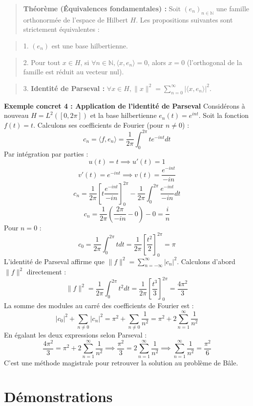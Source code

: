 \documentclass[11pt,a4paper]{article}
\begin{document}
\begin{quote}\textbf{Théorème (Équivalences fondamentales) :} Soit $(e_n)_{n \in \mathbb{N}}$ une famille orthonormée de l'espace de Hilbert $H$. Les propositions suivantes sont strictement équivalentes :\end{quote}
\begin{quote}1. $(e_n)$ est une base hilbertienne.\end{quote}
\begin{quote}2. Pour tout $x \in H$, si $\forall n \in \mathbb{N}, \langle x, e_n \rangle = 0$, alors $x=0$ (l'orthogonal de la famille est réduit au vecteur nul).\end{quote}
\begin{quote}3. \textbf{Identité de Parseval :} $\forall x \in H, \|x\|^2 = \sum_{n=0}^\infty |\langle x, e_n \rangle|^2$.\end{quote}

\textbf{Exemple concret 4 : Application de l'identité de Parseval}
Considérons à nouveau $H = L^2([0, 2\pi])$ et la base hilbertienne $e_n(t) = e^{int}$.
Soit la fonction $f(t) = t$. Calculons ses coefficients de Fourier (pour $n \neq 0$) :
$$ c_n = \langle f, e_n \rangle = \frac{1}{2\pi} \int_0^{2\pi} t e^{-int} dt $$
Par intégration par parties :
$$ u(t) = t \implies u'(t) = 1 $$
$$ v'(t) = e^{-int} \implies v(t) = \frac{e^{-int}}{-in} $$
$$ c_n = \frac{1}{2\pi} \left[ t \frac{e^{-int}}{-in} \right]_0^{2\pi} - \frac{1}{2\pi} \int_0^{2\pi} \frac{e^{-int}}{-in} dt $$
$$ c_n = \frac{1}{2\pi} \left( \frac{2\pi}{-in} - 0 \right) - 0 = \frac{i}{n} $$
Pour $n = 0$ :
$$ c_0 = \frac{1}{2\pi} \int_0^{2\pi} t dt = \frac{1}{2\pi} \left[ \frac{t^2}{2} \right]_0^{2\pi} = \pi $$
L'identité de Parseval affirme que $\|f\|^2 = \sum_{n=-\infty}^\infty |c_n|^2$.
Calculons d'abord $\|f\|^2$ directement :
$$ \|f\|^2 = \frac{1}{2\pi} \int_0^{2\pi} t^2 dt = \frac{1}{2\pi} \left[ \frac{t^3}{3} \right]_0^{2\pi} = \frac{4\pi^2}{3} $$
La somme des modules au carré des coefficients de Fourier est :
$$ |c_0|^2 + \sum_{n \neq 0} |c_n|^2 = \pi^2 + \sum_{n \neq 0} \frac{1}{n^2} = \pi^2 + 2 \sum_{n=1}^\infty \frac{1}{n^2} $$
En égalant les deux expressions selon Parseval :
$$ \frac{4\pi^2}{3} = \pi^2 + 2 \sum_{n=1}^\infty \frac{1}{n^2} \implies \frac{\pi^2}{3} = 2 \sum_{n=1}^\infty \frac{1}{n^2} \implies \sum_{n=1}^\infty \frac{1}{n^2} = \frac{\pi^2}{6} $$
C'est une méthode magistrale pour retrouver la solution au problème de Bâle.

\section{Démonstrations}
\end{document}
